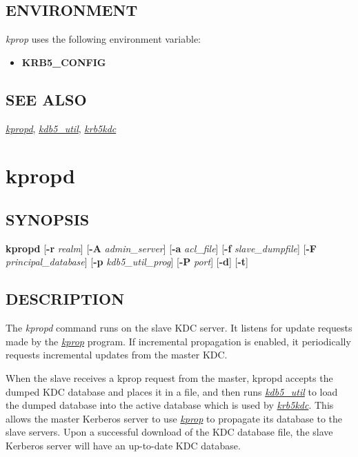 \documentclass[letterpaper,10pt,english]{sphinxmanual}
\begin{document}
\subsection{ENVIRONMENT}
\label{admin/admin_commands/kprop:environment}
\emph{kprop} uses the following environment variable:
\begin{itemize}
\item {} 
\textbf{KRB5\_CONFIG}

\end{itemize}


\subsection{SEE ALSO}
\label{admin/admin_commands/kprop:see-also}
{\hyperref[admin/admin_commands/kpropd:kpropd-8]{\emph{kpropd}}}, {\hyperref[admin/admin_commands/kdb5_util:kdb5-util-8]{\emph{kdb5\_util}}}, {\hyperref[admin/admin_commands/krb5kdc:krb5kdc-8]{\emph{krb5kdc}}}


\section{kpropd}
\label{admin/admin_commands/kpropd::doc}\label{admin/admin_commands/kpropd:kpropd}\label{admin/admin_commands/kpropd:kpropd-8}

\subsection{SYNOPSIS}
\label{admin/admin_commands/kpropd:synopsis}
\textbf{kpropd}
{[}\textbf{-r} \emph{realm}{]}
{[}\textbf{-A} \emph{admin\_server}{]}
{[}\textbf{-a} \emph{acl\_file}{]}
{[}\textbf{-f} \emph{slave\_dumpfile}{]}
{[}\textbf{-F} \emph{principal\_database}{]}
{[}\textbf{-p} \emph{kdb5\_util\_prog}{]}
{[}\textbf{-P} \emph{port}{]}
{[}\textbf{-d}{]}
{[}\textbf{-t}{]}


\subsection{DESCRIPTION}
\label{admin/admin_commands/kpropd:description}
The \emph{kpropd} command runs on the slave KDC server.  It listens for
update requests made by the {\hyperref[admin/admin_commands/kprop:kprop-8]{\emph{kprop}}} program.  If incremental
propagation is enabled, it periodically requests incremental updates
from the master KDC.

When the slave receives a kprop request from the master, kpropd
accepts the dumped KDC database and places it in a file, and then runs
{\hyperref[admin/admin_commands/kdb5_util:kdb5-util-8]{\emph{kdb5\_util}}} to load the dumped database into the active
database which is used by {\hyperref[admin/admin_commands/krb5kdc:krb5kdc-8]{\emph{krb5kdc}}}.  This allows the master
Kerberos server to use {\hyperref[admin/admin_commands/kprop:kprop-8]{\emph{kprop}}} to propagate its database to
the slave servers.  Upon a successful download of the KDC database
file, the slave Kerberos server will have an up-to-date KDC database.
\end{document}
